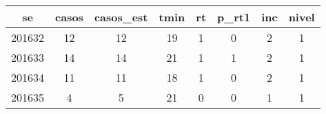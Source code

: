 \begin{tabular}{c|ccccccc}
  \hline
se & casos & casos\_est & tmin & rt & p\_rt1 & inc & nivel \\ 
  \hline
201632 & 12 & 12 & 19 & 1 & 0 & 2 & 1 \\ 
  201633 & 14 & 14 & 21 & 1 & 1 & 2 & 1 \\ 
  201634 & 11 & 11 & 18 & 1 & 0 & 2 & 1 \\ 
  201635 & 4 & 5 & 21 & 0 & 0 & 1 & 1 \\ 
   \hline
\end{tabular}
